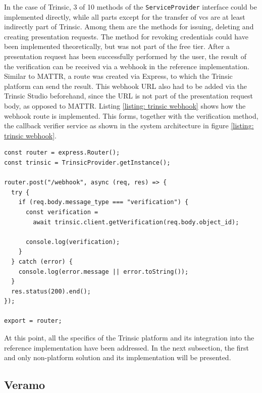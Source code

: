     In the case of Trinsic, 3 of 10 methods of the \texttt{ServiceProvider} interface could be implemented directly, while all parts except for the transfer of \acp{vc} are at least indirectly part of Trinsic. Among them are the methods for issuing, deleting and creating presentation requests. The method for revoking credentials could have been implemented theoretically, but was not part of the free tier. After a presentation request has been successfully performed by the user, the result of the verification can be received via a webhook in the reference implementation. Similar to MATTR, a route was created via Express, to which the Trinsic platform can send the result. This webhook URL also had to be added via the Trinsic Studio beforehand, since the URL is not part of the presentation request body, as opposed to MATTR. Listing \ref{listing: trinsic webhook} shows how the webhook route is implemented. This forms, together with the verification method, the callback verifier service as shown in the system architecture in figure \ref{listing: trinsic webhook}.
    \newline
    
    \begin{lstlisting}[style=ES6, caption=Trinsic webhook for verification result, label={listing: trinsic webhook}]
const router = express.Router();
const trinsic = TrinsicProvider.getInstance();

router.post("/webhook", async (req, res) => {
  try {
    if (req.body.message_type === "verification") {
      const verification = 
        await trinsic.client.getVerification(req.body.object_id);
        
      console.log(verification);
    }
  } catch (error) {
    console.log(error.message || error.toString());
  }
  res.status(200).end();
});

export = router;
\end{lstlisting}

        At this point, all the specifics of the Trinsic platform and its integration into the reference implementation have been addressed. In the next subsection, the first and only non-platform solution and its implementation will be presented.
    
        \subsection{Veramo}
        
